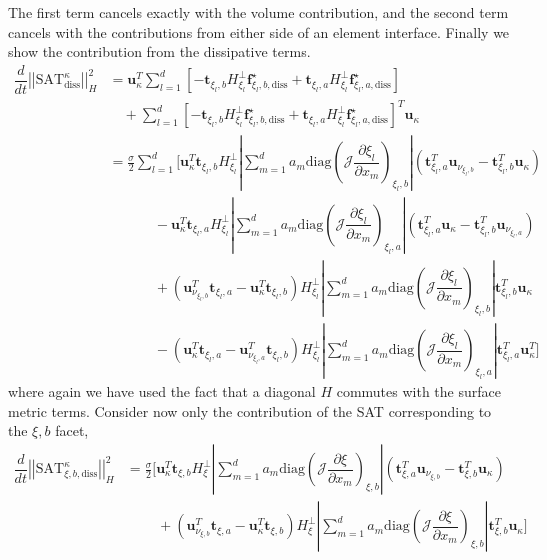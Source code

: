 \documentclass[12pt,a4paper]{article}
\newcommand{\pder}[2][]{\dfrac{\partial #1}{\partial #2}} %
\newcommand{\der}[2][]{\dfrac{d #1}{d #2}} %
\newcommand{\norm}[1]{\left\vert \left\vert #1 \right\vert \right\vert} %
\newcommand{\fn}[1]{\mathcal{#1}} %
\begin{document}
The first term cancels exactly with the volume contribution, and the second term cancels with the contributions from either side of an element interface. Finally we show the contribution from the dissipative terms.
\begin{align*}
\der{t} \norm{ \text{SAT}_\text{diss}^\kappa }^2_{H} &=
 \bm{u}^T_\kappa \sum_{l = 1}^d \left[  - \bm{t}_{\xi_l,b} H^{\bot}_{\xi_l}  \bm{f}^\star_{\xi_l,b,\text{diss}} + \bm{t}_{\xi_l,a} H^{\bot}_{\xi_l} \bm{f}^\star_{\xi_l,a,\text{diss}} \right] \\
& \quad  + \sum_{l = 1}^d\left[  - \bm{t}_{\xi_l,b} H^{\bot}_{\xi_l}  \bm{f}^\star_{\xi_l,b,\text{diss}} + \bm{t}_{\xi_l,a} H^{\bot}_{\xi_l} \bm{f}^\star_{\xi_l,a,\text{diss}} \right]^T  \bm{u} _\kappa \\
&= \frac{\sigma}{2} \sum_{l = 1}^d \Bigg[ \bm{u}^T_\kappa \bm{t}_{\xi_l,b} H^{\bot}_{\xi_l} \left\vert \sum_{m=1}^d a_m \text{diag} \left( \fn{J} \pder[\xi_l]{x_m} \right)_{\xi_l,b} \right\vert \left( \bm{t}^T_{\xi_l,a} \bm{u}_{\nu_{\xi_l,b}} - \bm{t}^T_{\xi_l,b} \bm{u}_\kappa   \right) \\
&  \qquad \  \quad - \bm{u}^T_\kappa  \bm{t}_{\xi_l,a} H^{\bot}_{\xi_l} \left\vert \sum_{m=1}^d a_m \text{diag} \left( \fn{J} \pder[\xi_l]{x_m} \right)_{\xi_l,a} \right\vert \left( \bm{t}^T_{\xi_l,a} \bm{u}_\kappa - \bm{t}^T_{\xi_l,b} \bm{u}_{\nu_{\xi_l,a}}  \right)  \\
&  \qquad \  \quad + \left(  \bm{u}_{\nu_{\xi_l,b}}^T \bm{t}_{\xi_l,a} -  \bm{u}_\kappa^T \bm{t}_{\xi_l,b}   \right) H^{\bot}_{\xi_l} \left\vert \sum_{m=1}^d a_m \text{diag} \left( \fn{J} \pder[\xi_l]{x_m} \right)_{\xi_l,b} \right\vert  \bm{t}^T_{\xi_l,b} \bm{u}_\kappa  \\
&  \qquad \  \quad - \left( \bm{u}_\kappa^T \bm{t}_{\xi_l,a}  - \bm{u}^T_{\nu_{\xi_l,a}}  \bm{t}_{\xi_l,b}  \right) H^{\bot}_{\xi_l} \left\vert \sum_{m=1}^d a_m \text{diag} \left( \fn{J} \pder[\xi_l]{x_m} \right)_{\xi_l,a} \right\vert  \bm{t}^T_{\xi_l,a}  \bm{u}^T_\kappa \Bigg]
\end{align*}
where again we have used the fact that a diagonal $H$ commutes with the surface metric terms. Consider now only the contribution of the SAT corresponding to the $\xi,b$ facet,
\begin{align*}
\der{t} \norm{ \text{SAT}_{\xi,b,\text{diss}}^\kappa }^2_{H} &= 
\frac{\sigma}{2} \Bigg[ \bm{u}^T_\kappa \bm{t}_{\xi,b} H^{\bot}_{\xi} \left\vert \sum_{m=1}^d a_m \text{diag} \left( \fn{J} \pder[\xi]{x_m} \right)_{\xi,b} \right\vert \left( \bm{t}^T_{\xi,a} \bm{u}_{\nu_{\xi,b}} - \bm{t}^T_{\xi,b} \bm{u}_\kappa   \right) \\
&  \qquad \  + \left(  \bm{u}_{\nu_{\xi,b}}^T \bm{t}_{\xi,a} -  \bm{u}_\kappa^T \bm{t}_{\xi,b}   \right) H^{\bot}_{\xi} \left\vert \sum_{m=1}^d a_m \text{diag} \left( \fn{J} \pder[\xi]{x_m} \right)_{\xi,b} \right\vert  \bm{t}^T_{\xi,b} \bm{u}_\kappa  \Bigg]
\end{align*}
\end{document}
